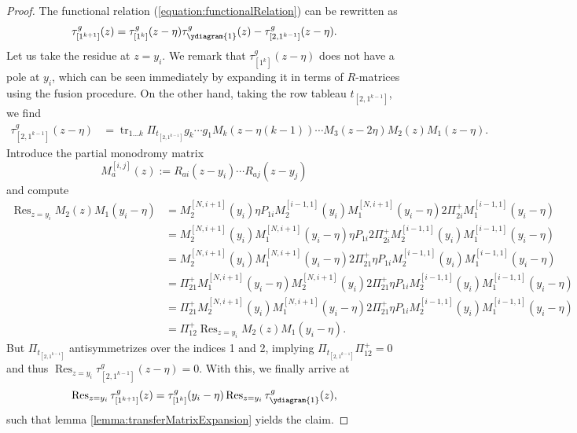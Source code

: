 \documentclass[11pt]{report}
\theoremstyle{definition}
\theoremstyle{remark}
\theoremstyle{remark}
\begin{document}
\begin{proof}
The functional relation (\ref{equation:functionalRelation}) can be rewritten as
\begin{equation*}
\tau_{[1^{k+1}]}^g(z) = \tau_{[1^k]}^g(z-\eta) \tau_{\ydiagram{1}}^g(z) - \tau_{[2,1^{k-1}]}^g(z-\eta).
\end{equation*}
Let us take the residue at $z=y_i$. We remark that $\tau_{[1^k]}^g(z-\eta)$ does not have a pole at $y_i$, which can be seen immediately by expanding it in terms of $R$-matrices using the fusion procedure. On the other hand, taking the row tableau $t_{[2,1^{k-1}]}$, we find
\begin{align*}
\tau_{[2,1^{k-1}]}^g(z-\eta)
&= \operatorname{tr}_{1...k} \Pi_{t_{[2,1^{k-1}]}} g_k \cdots g_1 M_k(z-\eta(k-1)) \cdots M_3(z-2\eta) M_2(z) M_1(z-\eta).
\end{align*}
Introduce the partial monodromy matrix
\begin{equation*}
M_a^{[i,j]}(z) := R_{ai}(z-y_i) \cdots R_{aj}(z-y_j)
\end{equation*}
and compute
\begin{align*}
\operatorname{Res}_{z=y_i} M_2(z) M_1(y_i-\eta)
&= M_2^{[N,i+1]}(y_i) \eta P_{1i} M_2^{[i-1,1]}(y_i) M_1^{[N,i+1]}(y_i-\eta) 2 \Pi_{2i}^+ M_1^{[i-1,1]}(y_i-\eta) \\
&= M_2^{[N,i+1]}(y_i) M_1^{[N,i+1]}(y_i-\eta) \eta P_{1i} 2 \Pi_{2i}^+ M_2^{[i-1,1]}(y_i) M_1^{[i-1,1]}(y_i-\eta) \\
&= M_2^{[N,i+1]}(y_i) M_1^{[N,i+1]}(y_i-\eta) 2 \Pi_{21}^+ \eta P_{1i} M_2^{[i-1,1]}(y_i) M_1^{[i-1,1]}(y_i-\eta) \\
&= \Pi_{21}^+ M_1^{[N,i+1]}(y_i-\eta) M_2^{[N,i+1]}(y_i) 2 \Pi_{21}^+ \eta P_{1i} M_2^{[i-1,1]}(y_i) M_1^{[i-1,1]}(y_i-\eta) \\
&= \Pi_{21}^+ M_2^{[N,i+1]}(y_i) M_1^{[N,i+1]}(y_i-\eta) 2 \Pi_{21}^+ \eta P_{1i} M_2^{[i-1,1]}(y_i) M_1^{[i-1,1]}(y_i-\eta) \\
&= \Pi_{12}^+ \operatorname{Res}_{z=y_i} M_2(z) M_1(y_i-\eta).
\end{align*}
But $\Pi_{t_{[2,1^{k-1}]}}$ antisymmetrizes over the indices 1 and 2, implying $\Pi_{t_{[2,1^{k-1}]}} \Pi_{12}^+ = 0$ and thus $\operatorname{Res}_{z=y_i} \tau_{[2,1^{k-1}]}^g(z-\eta) = 0$. With this, we finally arrive at
\begin{equation*}
\operatorname{Res}_{z=y_i} \tau_{[1^{k+1}]}^g(z)
= \tau_{[1^k]}^g(y_i-\eta) \operatorname{Res}_{z=y_i} \tau_{\ydiagram{1}}^g(z),
\end{equation*}
such that lemma \ref{lemma:transferMatrixExpansion} yields the claim.
\end{proof}
\end{document}
